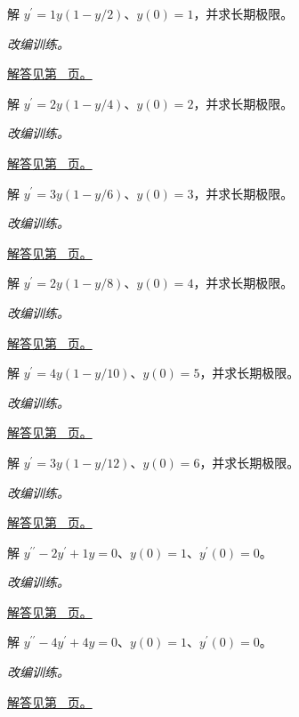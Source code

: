 \documentclass[12pt,fontset=fandol]{ctexart}
\begin{document}
\begin{example}\label{ex:c23q7}
解 $y^{\prime}=1y(1-y/2)$、$y(0)=1$，并求长期极限。
\par\textit{改编训练。}\par\hyperref[ans:c23q7]{解答见第~\pageref{ans:c23q7} 页。}
\end{example}
\begin{example}\label{ex:c23q8}
解 $y^{\prime}=2y(1-y/4)$、$y(0)=2$，并求长期极限。
\par\textit{改编训练。}\par\hyperref[ans:c23q8]{解答见第~\pageref{ans:c23q8} 页。}
\end{example}
\begin{example}\label{ex:c23q9}
解 $y^{\prime}=3y(1-y/6)$、$y(0)=3$，并求长期极限。
\par\textit{改编训练。}\par\hyperref[ans:c23q9]{解答见第~\pageref{ans:c23q9} 页。}
\end{example}
\begin{example}\label{ex:c23q10}
解 $y^{\prime}=2y(1-y/8)$、$y(0)=4$，并求长期极限。
\par\textit{改编训练。}\par\hyperref[ans:c23q10]{解答见第~\pageref{ans:c23q10} 页。}
\end{example}
\begin{example}\label{ex:c23q11}
解 $y^{\prime}=4y(1-y/10)$、$y(0)=5$，并求长期极限。
\par\textit{改编训练。}\par\hyperref[ans:c23q11]{解答见第~\pageref{ans:c23q11} 页。}
\end{example}
\begin{example}\label{ex:c23q12}
解 $y^{\prime}=3y(1-y/12)$、$y(0)=6$，并求长期极限。
\par\textit{改编训练。}\par\hyperref[ans:c23q12]{解答见第~\pageref{ans:c23q12} 页。}
\end{example}
\begin{example}[重复特征根]\label{ex:c23q13}
解 $y^{\prime\prime}-2y^{\prime}+1y=0$、$y(0)=1$、$y^{\prime}(0)=0$。
\par\textit{改编训练。}\par\hyperref[ans:c23q13]{解答见第~\pageref{ans:c23q13} 页。}
\end{example}
\begin{example}[重复特征根]\label{ex:c23q14}
解 $y^{\prime\prime}-4y^{\prime}+4y=0$、$y(0)=1$、$y^{\prime}(0)=0$。
\par\textit{改编训练。}\par\hyperref[ans:c23q14]{解答见第~\pageref{ans:c23q14} 页。}
\end{example}
\end{document}
